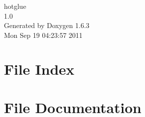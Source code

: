 \documentclass[a4paper]{book}
\begin{document}
\hypersetup{pageanchor=false}
\begin{titlepage}
\vspace*{7cm}
\begin{center}
{\Large hotglue \\[1ex]\large 1.0 }\\
\vspace*{1cm}
{\large Generated by Doxygen 1.6.3}\\
\vspace*{0.5cm}
{\small Mon Sep 19 04:23:57 2011}\\
\end{center}
\end{titlepage}
\clearemptydoublepage
{}
\tableofcontents
\clearemptydoublepage
{}
\hypersetup{pageanchor=true}
\chapter{File Index}

\chapter{File Documentation}
























\printindex
\end{document}
